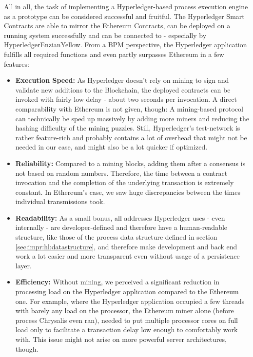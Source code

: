 All in all, the task of implementing a Hyperledger-based process execution engine as a prototype can be considered successful and fruitful. The Hyperledger Smart Contracts are able to mirror the Ethereum Contracts, can be deployed on a running system successfully and can be connected to - especially by HyperledgerEnzianYellow. From a BPM perspective, the Hyperledger application fulfills all required functions and even partly surpasses Ethereum in a few features:
\begin{itemize}
    \item \textbf{Execution Speed:} As Hyperledger doesn't rely on mining to sign and validate new additions to the Blockchain, the deployed contracts can be invoked with fairly low delay - about two seconds per invocation. A direct comparability with Ethereum is not given, though: A mining-based protocol can technically be sped up massively by adding more miners and reducing the hashing difficulty of the mining puzzles. Still, Hyperledger's test-network is rather feature-rich and probably contains a lot of overhead that might not be needed in our case, and might also be a lot quicker if optimized.
    \item \textbf{Reliability:} Compared to a mining blocks, adding them after a consensus is not based on random numbers. Therefore, the time between a contract invocation and the completion of the underlying transaction is extremely constant. In Ethereum's case, we saw huge discrepancies between the times individual transmissions took.
    \item \textbf{Readability:} As a small bonus, all addresses Hyperledger uses - even internally - are developer-defined and therefore have a human-readable structure, like those of the process data structure defined in section \ref{sec:impr:hl:datastructure}, and therefore make development and back end work a lot easier and more transparent even without usage of a persistence layer.
    \item \textbf{Efficiency:} Without mining, we perceived a significant reduction in processing load on the Hyperledger application compared to the Ethereum one. For example, where the Hyperledger application occupied a few threads with barely any load on the processor, the Ethereum miner alone (before process Chrysalis even ran), needed to put multiple processor cores on full load only to facilitate a transaction delay low enough to comfortably work with. This issue might not arise on more powerful server architectures, though.
\end{itemize}
